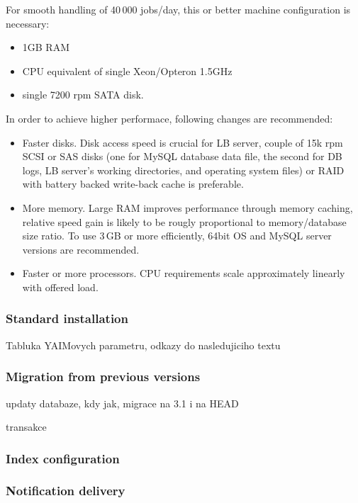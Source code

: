 For smooth handling of 40\,000 jobs/day, this or better machine configuration 
is necessary:
\begin{itemize}
\item 1GB RAM
\item CPU equivalent of single Xeon/Opteron 1.5GHz
\item single 7200 rpm SATA disk.
\end{itemize}
In order to achieve higher performace, following changes are recommended:
\begin{itemize}
\item Faster disks. Disk access speed is crucial for LB server, couple of 15k rpm
SCSI or SAS disks (one for MySQL database data file, the second for DB logs, LB server's
working directories, and operating system files) or RAID with battery backed 
write-back cache is preferable.
\item More memory. Large RAM improves performance through memory caching,
relative speed gain is likely to be rougly proportional to memory/database size ratio.
To use 3\,GB or more efficiently, 64bit OS and MySQL server versions are recommended.
\item Faster or more processors. CPU requirements scale approximately linearly with
offered load.
\end{itemize}

\subsubsection{Standard installation}


Tabluka YAIMovych parametru, odkazy do nasledujiciho textu

\subsubsection{Migration from previous versions}


updaty databaze, kdy jak, migrace na 3.1 i na HEAD

transakce


\subsubsection{Index configuration}


\subsubsection{Notification delivery}

